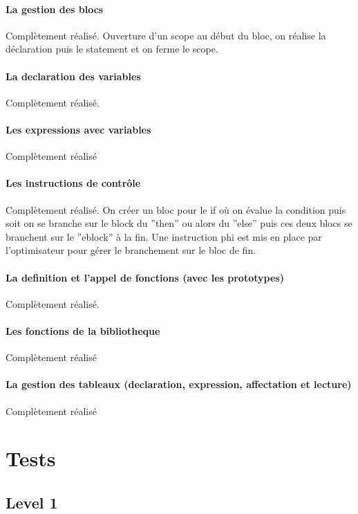 \documentclass{article}
\begin{document}
\paragraph{La gestion des blocs}
Complètement réalisé.
Ouverture d'un scope au début du bloc, on réalise la déclaration puis le statement et on ferme le 
scope.

\paragraph{La declaration des variables}
Complètement réalisé.

\paragraph{Les expressions avec variables}
Complètement réalisé

\paragraph{Les instructions de contrôle }
Complètement réalisé.
On créer un bloc pour le if où on évalue la condition puis soit on se branche sur le block du ''then'' 
ou alors du ''else'' puis ces deux blocs se branchent sur le ''eblock'' à la
fin. Une instruction phi est mis en place par l'optimisateur pour gérer le
branchement sur le bloc de fin.

\paragraph{La definition et l'appel de fonctions (avec les prototypes)}
Complètement réalisé.


\paragraph{Les fonctions de la bibliotheque}
Complètement réalisé


\paragraph{La gestion des tableaux (declaration, expression, affectation et
  lecture)} 
Complètement réalisé

\section{Tests}

\subsection{Level 1}
\end{document}

